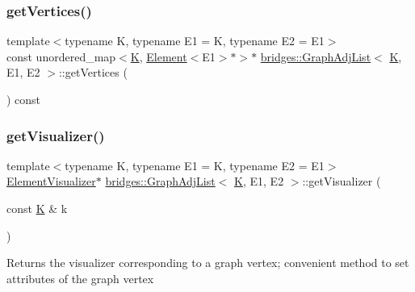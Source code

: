 \subsubsection{\texorpdfstring{getVertices()}{getVertices()}\hspace{0.1cm}{\footnotesize\ttfamily [2/2]}}
{\footnotesize\ttfamily template$<$typename K, typename E1 = K, typename E2 = E1$>$ \\
const unordered\+\_\+map$<$\mbox{\hyperlink{namespacebridges_acfb0a4f7877d8f63de3e6862004c50edaa5f3c6a11b03839d46af9fb43c97c188}{K}}, \mbox{\hyperlink{classbridges_1_1_element}{Element}}$<$E1$>$$\ast$$>$$\ast$ \mbox{\hyperlink{classbridges_1_1_graph_adj_list}{bridges\+::\+Graph\+Adj\+List}}$<$ \mbox{\hyperlink{namespacebridges_acfb0a4f7877d8f63de3e6862004c50edaa5f3c6a11b03839d46af9fb43c97c188}{K}}, E1, E2 $>$\+::get\+Vertices (\begin{DoxyParamCaption}{ }\end{DoxyParamCaption}) const\hspace{0.3cm}{\ttfamily [inline]}}

\mbox{\label{classbridges_1_1_graph_adj_list_a1c2c773a13dbd1fddd55bc2642c08574}} 
\subsubsection{\texorpdfstring{getVisualizer()}{getVisualizer()}}
{\footnotesize\ttfamily template$<$typename K, typename E1 = K, typename E2 = E1$>$ \\
\mbox{\hyperlink{classbridges_1_1_element_visualizer}{Element\+Visualizer}}$\ast$ \mbox{\hyperlink{classbridges_1_1_graph_adj_list}{bridges\+::\+Graph\+Adj\+List}}$<$ \mbox{\hyperlink{namespacebridges_acfb0a4f7877d8f63de3e6862004c50edaa5f3c6a11b03839d46af9fb43c97c188}{K}}, E1, E2 $>$\+::get\+Visualizer (\begin{DoxyParamCaption}\item[{const \mbox{\hyperlink{namespacebridges_acfb0a4f7877d8f63de3e6862004c50edaa5f3c6a11b03839d46af9fb43c97c188}{K}} \&}]{k }\end{DoxyParamCaption})\hspace{0.3cm}{\ttfamily [inline]}}

Returns the visualizer corresponding to a graph vertex; convenient method to set attributes of the graph vertex


